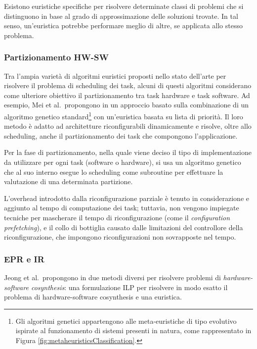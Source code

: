 Esistono euristiche specifiche per risolvere determinate classi di problemi che 
si distinguono in base al grado di approssimazione delle soluzioni trovate. 
In tal senso, un'euristica potrebbe performare meglio di altre, se applicata 
allo stesso problema.

\subsubsection{Partizionamento HW-SW}
Tra l'ampia varietà di algoritmi euristici proposti nello stato dell'arte per 
risolvere il problema di scheduling dei task, alcuni di questi algoritmi 
considerano come ulteriore obiettivo il partizionamento tra task hardware e 
task software. Ad esempio, Mei et al.~propongono in 
\cite{MeiPartitioningScheduling} un approccio basato sulla combinazione di un 
algoritmo genetico standard\footnote{Gli algoritmi genetici appartengono alle 
meta-euristiche di tipo evolutivo ispirate al funzionamento di sistemi presenti 
in natura, come rappresentato in Figura 
\ref{fig:metaheuristicsClassification}.} con un'euristica basata su lista di 
priorità. Il loro metodo è adatto ad architetture riconfigurabili dinamicamente 
e risolve, oltre allo scheduling, anche il partizionamento dei task che 
compongono l'applicazione.

Per la fase di partizionamento, nella quale viene deciso il tipo 
di implementazione da utilizzare per ogni task (software o hardware), si usa un 
algoritmo genetico che al suo interno esegue lo scheduling come subroutine per 
effettuare la valutazione di una determinata partizione.

L'overhead introdotto dalla riconfigurazione parziale è tenuto in 
considerazione e aggiunto al tempo di computazione dei task; tuttavia, non 
vengono impiegate tecniche per mascherare il tempo di riconfigurazione (come il 
\emph{configuration prefetching}), e il collo di bottiglia causato dalle 
limitazioni del controllore della riconfigurazione, che impongono 
riconfigurazioni non sovrapposte nel tempo.


\subsubsection{\acl{EPR} e \acl{IR}}
Jeong et al.~propongono in \cite{JeongHWSWCosynthesis} due metodi diversi per 
risolvere problemi di \emph{hardware-software cosynthesis}: una formulazione 
\ac{ILP} per risolvere in modo esatto il problema di hardware-software 
cosynthesis e una euristica.

